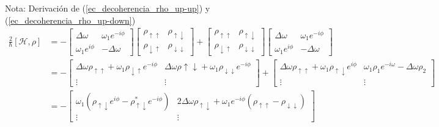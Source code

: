 \documentclass[a4paper,11pt]{book} %
\numberwithin{equation}{chapter}
\def\lp{\left(}
\def\rp{\right)}
\def\lc{\left[}
\def\rc{\right]}
\begin{document}
	\begin{mybox_blue}{Nota: Derivación de (\ref{ec_decoherencia_rho_up-up}) y  (\ref{ec_decoherencia_rho_up-down})}
		\begin{align*}
		\frac{2}{\hbar}\lc \mathcal{H} , \rho \rc & = - 
		\begin{bmatrix}
		\Delta \omega & \omega_1 e^{-i \phi} \\
		\omega_1 e^{i \phi} & - \Delta \omega
		\end{bmatrix} 
		\begin{bmatrix}
		\rho_{\uparrow \uparrow} & \rho_{\uparrow \downarrow} \\
		\rho_{\downarrow \uparrow} & \rho_{\downarrow \downarrow}
		\end{bmatrix}
		+
		\begin{bmatrix}
		\rho_{\uparrow \uparrow} & \rho_{\uparrow \downarrow} \\
		\rho_{\downarrow \uparrow} & \rho_{\downarrow \downarrow}
		\end{bmatrix}
		\begin{bmatrix}
		\Delta \omega & \omega_1 e^{-i \phi} \\
		\omega_1 e^{i \phi} & - \Delta \omega
		\end{bmatrix}  \\
		& = -  \begin{bmatrix}
		\Delta \omega \rho_{\uparrow \uparrow} +
		\omega_1 \rho_{\downarrow \uparrow} e^{-i \phi} 
		& \Delta \omega \rho{\uparrow \downarrow} + \omega_1 \rho_{\downarrow \downarrow} e^{-i \phi} \\
		\vdots & \vdots
		\end{bmatrix}
		+  \begin{bmatrix}
		\Delta \omega \rho_{\uparrow \uparrow} + \omega_1 \rho_{\uparrow \downarrow} e^{i \phi} & \omega_1 \rho_1 e^{-i \omega} - \Delta \omega \rho_2 \\
		\vdots & \vdots 
		\end{bmatrix} \\
		& = - \begin{bmatrix}
		\omega_1 \lp \rho_{\uparrow \downarrow} e^{i \phi} - \rho^{*}_{\uparrow \downarrow} e^{-i \phi} \rp & 
		2 \Delta \omega \rho_{\uparrow \downarrow} + \omega_1 e^{-i \phi} \lp \rho_{\uparrow \uparrow} - \rho_{\downarrow \downarrow} \rp \\
		\vdots & \vdots
		\end{bmatrix}
		\end{align*}
	\end{mybox_blue}
\end{document}
